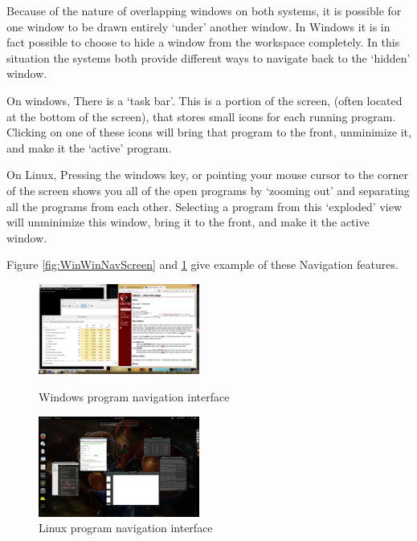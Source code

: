 \documentclass[a4paper]{report}
\begin{document}
Because of the nature of overlapping windows on both systems, it is possible for one window to be drawn entirely `under' another window. In Windows it is in fact possible to choose to hide a window from the workspace completely. In this situation the systems both provide different ways to navigate back to the `hidden' window.

On windows, There is a `task bar'. This is a portion of the screen, (often located at the bottom of the screen), that stores small icons for each running program. Clicking on one of these icons will bring that program to the front, unminimize it, and make it the `active' program.

On Linux, Pressing the windows key, or pointing your mouse cursor to the corner of the screen shows you all of the open programs by `zooming out' and separating all the programs from each other. Selecting a program from this `exploded' view will unminimize this window, bring it to the front, and make it the active window.

Figure \ref{fig:WinWinNavScreen} and \ref{fig:LinWinNavScreen} give example of these Navigation features.

\begin{figure}[ht]
\centering
\begin{minipage}{.5\textwidth}
  \centering
  \includegraphics[width=200px]{images/Windows_Window_Navigation_Screenshot}
  \caption{Windows program navigation interface}
  \label{fig:WinWinNavScreen}
\end{minipage}%
\begin{minipage}{.5\textwidth}
  \centering
  \includegraphics[width=200px]{images/Linux_Window_Navigation_Screenshot}
  \caption{Linux program navigation interface}
  \label{fig:LinWinNavScreen}
\end{minipage}
\end{figure}
\end{document}
